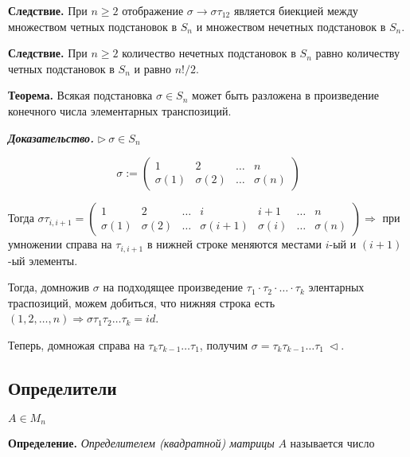\vspace{\baselineskip}
\textbf{Следствие.} При $n \geq 2$ отображение $\sigma \rightarrow \sigma \tau_{12}$ является биекцией между множеством четных подстановок в $S_n$ и множеством нечетных подстановок в $S_n$.

\vspace{\baselineskip}
\textbf{Следствие.} При $n \geq 2$ количество нечетных подстановок в $S_n$ равно количеству четных подстановок в $S_n$ и равно $n!/2$.

\vspace{\baselineskip}
\textbf{Теорема.} Всякая подстановка $\sigma \in S_n$ может быть разложена в произведение конечного числа элементарных транспозиций.

\vspace{\baselineskip}
\textbf{\textit{Доказательство.}} $\rhd \ \sigma \in S_n$

\begin{equation*}\sigma := 
\begin{pmatrix} 
	1 & 2 & \dots & n \\ 
	\sigma (1) & \sigma (2) & \dots & \sigma (n)
\end{pmatrix}\end{equation*}

Тогда $\sigma \tau_{i, i+1} = \begin{pmatrix} 
	1 & 2 & \dots & i & i+1 & \dots & n \\ 
	\sigma (1) & \sigma (2) & \dots & \sigma(i+1) & \sigma(i) & \dots & \sigma (n)
\end{pmatrix} \Rightarrow$ при умножении справа на $\tau_{i, i+1}$ в нижней строке меняются местами $i$-ый и $(i+1)$-ый элементы.

Тогда, домножив $\sigma$ на подходящее произведение $\tau_1 \cdot \tau_2 \cdot \dots \cdot \tau_k$ элентарных траспозиций, можем добиться, что нижняя строка есть $(1, 2, \dots, n) \Rightarrow \sigma \tau_1 \tau_2 \dots \tau_k = id$.

Теперь, домножая справа на $\tau_k \tau_{k-1} \dots \tau_1$, получим $\sigma = \tau_k \tau_{k-1} \dots \tau_1 \ \lhd$.

\subsection{Определители}

$A \in M_n$

\vspace{\baselineskip}
\textbf{Определение.} \textit{Определителем (квадратной) матрицы} $A$ называется число 

